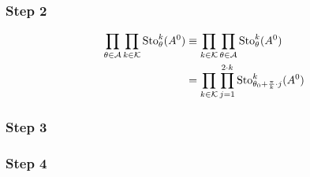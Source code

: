 \subsubsection{Step 2}
\begin{align*}
  \prod_{\theta\in\mathcal{A}}\prod_{k\in\mathcal{K}}\operatorname{Sto}_\theta^k(A^0)
  &\equiv \prod_{k\in\mathcal{K}}\prod_{\theta\in\mathcal{A}}\operatorname{Sto}_\theta^k(A^0)
\\&= \prod_{k\in\mathcal{K}} \prod_{j=1}^{2\cdot k}
  \operatorname{Sto}_{\theta_0+\frac{\pi}{k}\cdot j}^k(A^0)
\end{align*}

\subsubsection{Step 3}

\subsubsection{Step 4}


